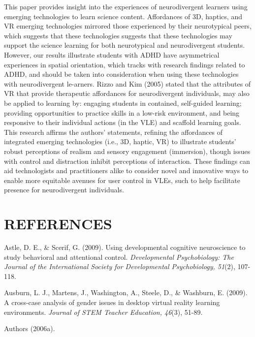 \documentclass[11.5pt]{sig-alternate} %
\begin{document}
\begin{large}
This paper provides insight into the experiences of neurodivergent learners using emerging technologies to learn science content. Affordances of 3D, haptics, and VR emerging technologies mirrored those experienced by their neurotypical peers, which suggests that these technologies suggests that these technologies may support the science learning for both neurotypical and neurodivergent students. However, our results illustrate students with ADHD have asymmetrical experiences in spatial orientation, which tracks with research findings related to ADHD, and should be taken into consideration when using these technologies with neurodivergent le-arners. Rizzo and Kim (2005) stated that the attributes of VR that provide therapeutic affordances for neurodivergent individuals, may also be applied to learning by: engaging students in contained, self-guided learning; providing opportunities to practice skills in a low-risk environment, and being responsive to their individual actions (in the VLE) and scaffold learning goals. This research affirms the authors’ statements, refining the affordances of integrated emerging technologies (i.e., 3D, haptic, VR) to illustrate students’ robust perceptions of realism and sensory engagement (immersion), though issues with control and distraction inhibit perceptions of interaction. These findings can aid technologists and practitioners alike to consider novel and innovative ways to enable more equitable avenues for user control in VLEs, such to help facilitate presence for neurodivergent individuals.  

\end{large}
\clearpage
\section*{REFERENCES}\par 

\leftskip 0.25in
\parindent -0.25in 

Astle, D. E., \& Scerif, G. (2009). Using developmental cognitive neuroscience to study behavioral and attentional control. \textit{Developmental Psychobiology: The Journal of the International Society for Developmental Psychobiology, 51}(2), 107-118.

Ausburn, L. J., Martens, J., Washington, A., Steele, D., \& Washburn, E. (2009). A cross-case analysis of gender issues in desktop virtual reality learning environments. \textit{Journal of STEM Teacher Education, 46}(3), 51-89.

Authors (2006a). 
\end{document}
